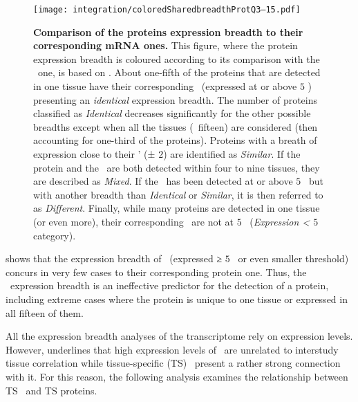 \begin{figure}[!htpb]
    \texttt{[image: integration/coloredSharedbreadthProtQ3--15.pdf]}\centering
    \vspace{-4mm}
    \caption[Comparison of the proteins expression breadth to their
    corresponding mRNA ones]{\label{fig:SharedBreadthProtQ3}%
    \textbf{Comparison of the proteins expression breadth
    to their corresponding mRNA ones.}
    This figure, where the protein expression breadth is coloured
    according to its comparison with the \mRNA\ one,
    is based on .
    About one-fifth of the proteins that are detected in one tissue
    have their corresponding \mRNA\ (expressed at or above $5$ \FPKM{})
    presenting an \emph{identical} expression breadth.
    The number of proteins classified as \emph{Identical} decreases significantly
    for the other possible breadths
    except when all the tissues (\ie\ fifteen) are considered
    (then accounting for one-third of the proteins).
    Proteins with a breath of expression close to their \mRNAs{}' (± $2$)
    are identified as \emph{Similar}.
    If the protein and the \mRNA\ are both detected within four to nine tissues,
    they are described as \emph{Mixed}.
    If the \mRNA\ has been detected at or above $5$ \FPKM\
    but with another breadth than \emph{Identical} or \emph{Similar},
    it is then referred to as \emph{Different}.
    Finally, while many proteins are detected in one tissue (or even more),
    their corresponding \mRNAs\ are not at $5$ \FPKM\
    (\emph{Expression < $5$ \FPKM} category).
    }
\end{figure}

 shows that the expression breadth
of \mRNAs\ (expressed ≥ $5$ \FPKM\ or even smaller threshold) concurs
in very few cases to their corresponding protein one.
Thus, the \mRNAs\ expression breadth is
an ineffective predictor for the detection of a protein,
including extreme cases where the protein is unique to one tissue
or expressed in all fifteen of them.


All the expression breadth analyses of the transcriptome rely on expression levels.
However,  underlines that
high expression levels of \mRNAs\ are unrelated to interstudy tissue correlation
while tissue-specific (\gls{TS}) \mRNAs\ present a rather strong connection with it.
For this reason, the following analysis examines
the relationship between \gls{TS} \mRNAs\ and \gls{TS} proteins.


